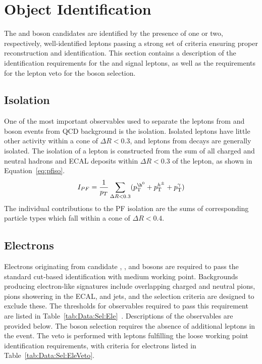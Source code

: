 \section{Object Identification}\label{ch:IdIso}
The \W and \Z boson candidates are identified by the presence of one or two, respectively, well-identified leptons passing a strong set of criteria ensuring proper reconstruction and identification. This section contains a description of the identification requirements for the \wlnu and \zll signal leptons, as well as the requirements for the lepton veto for the \Wpm boson selection.

\subsection{Isolation}\label{ch:id:iso}
One of the most important observables used to separate the leptons from \Wp and \Wm boson events from QCD background is the isolation. Isolated leptons have little other activity within a cone of $\Delta R < 0.3$, and leptons from \wlnu decays are generally isolated. The isolation of a lepton is constructed from the sum of all charged and neutral hadrons and ECAL deposits within $\Delta R < 0.3$ of the lepton, as shown in Equation~\ref{eq:pfiso}. 
\begin{equation}
    I_{PF} = \frac{1}{p_T}\sum_{\Delta R<0.3}( \pt^{\h^0} + \pt^{h^\pm} +  \pt^{\gamma})
    \label{eq:pfiso}
\end{equation}
The individual contributions to the PF isolation are the sums of corresponding particle types which fall within a cone of $\Delta R < 0.4$.

\subsection{Electrons}\label{ch:IdIso:Ele}
Electrons originating from candidate \Wp, \Wm, and \Z bosons are required to pass the standard cut-based identification with medium working point. Backgrounds producing electron-like signatures include overlapping charged and neutral pions, pions showering in the ECAL, and jets, and the selection criteria are designed to exclude these. The thresholds for observables required to pass this requirement are listed in Table~\ref{tab:Data:Sel:Ele}~\cite{EgammaIDIsoCuts}. Descriptions of the observables are provided below. The \Wpm boson selection requires the absence of additional leptons in the event. The veto is performed with leptons fulfilling the loose working point identification requirements, with criteria for electrons listed in Table~\ref{tab:Data:Sel:EleVeto}. 
